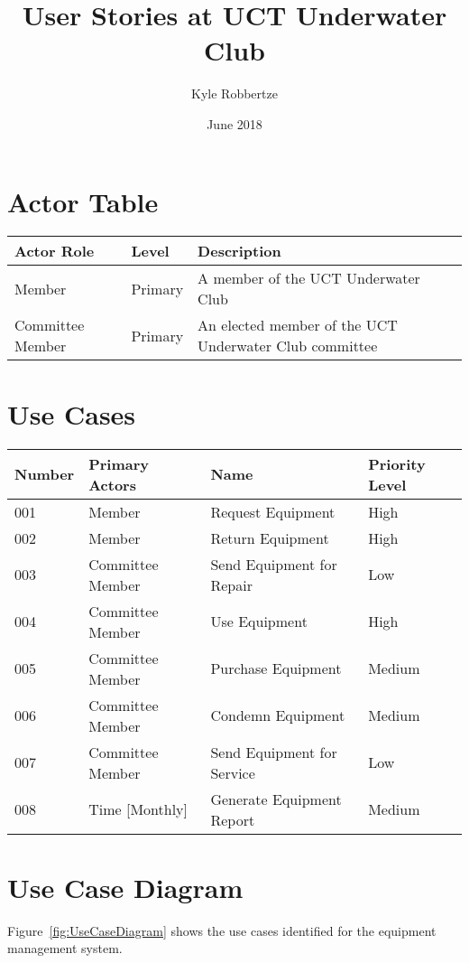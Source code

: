 \documentclass[12pt,a4paper]{article}
\begin{document}
\title{User Stories at UCT Underwater Club}
\author{Kyle Robbertze}
\date{June 2018}
\maketitle

\section{Actor Table}
\begin{tabular}{| p{} | p{} | p{} |}
  \hline
  \textbf{Actor Role} & \textbf{Level} & \textbf{Description} \\\hline
  Member & Primary & A member of the UCT Underwater Club \\\hline
  Committee Member & Primary & An elected member of the UCT Underwater Club
  committee \\\hline
\end{tabular}

\section{Use Cases}
\begin{tabular}{| p{} | p{} | p{} | p{} |}
  \hline
  \textbf{Number} & \textbf{Primary Actors} & \textbf{Name} & \textbf{Priority
  Level} \\\hline
  001 & Member & Request Equipment & High \\\hline
  002 & Member & Return Equipment & High \\\hline
  003 & Committee Member & Send Equipment for Repair & Low \\\hline
  004 & Committee Member & Use Equipment & High \\\hline
  005 & Committee Member & Purchase Equipment & Medium \\\hline
  006 & Committee Member & Condemn Equipment & Medium \\\hline
  007 & Committee Member & Send Equipment for Service & Low \\\hline
  008 & Time [Monthly] & Generate Equipment Report & Medium \\\hline
\end{tabular}

\newpage

\section{Use Case Diagram}
Figure~\ref{fig:UseCaseDiagram} shows the use cases identified for the equipment
management system.
\end{document}
